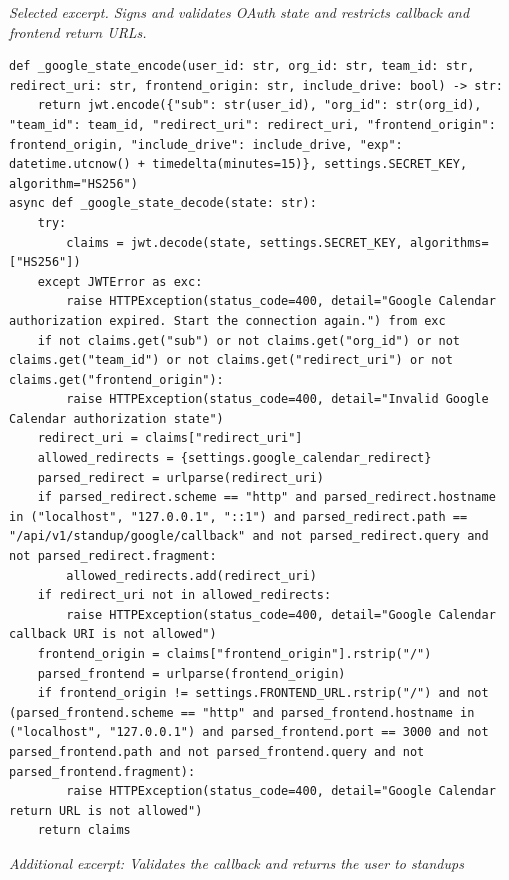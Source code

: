 \documentclass[11pt,a4paper]{article}
\begin{document}
{\textit{Selected excerpt. Signs and validates OAuth state and restricts callback and frontend return URLs.}

\begin{lstlisting}[style=python]
def _google_state_encode(user_id: str, org_id: str, team_id: str, redirect_uri: str, frontend_origin: str, include_drive: bool) -> str:
    return jwt.encode({"sub": str(user_id), "org_id": str(org_id), "team_id": team_id, "redirect_uri": redirect_uri, "frontend_origin": frontend_origin, "include_drive": include_drive, "exp": datetime.utcnow() + timedelta(minutes=15)}, settings.SECRET_KEY, algorithm="HS256")
async def _google_state_decode(state: str):
    try:
        claims = jwt.decode(state, settings.SECRET_KEY, algorithms=["HS256"])
    except JWTError as exc:
        raise HTTPException(status_code=400, detail="Google Calendar authorization expired. Start the connection again.") from exc
    if not claims.get("sub") or not claims.get("org_id") or not claims.get("team_id") or not claims.get("redirect_uri") or not claims.get("frontend_origin"):
        raise HTTPException(status_code=400, detail="Invalid Google Calendar authorization state")
    redirect_uri = claims["redirect_uri"]
    allowed_redirects = {settings.google_calendar_redirect}
    parsed_redirect = urlparse(redirect_uri)
    if parsed_redirect.scheme == "http" and parsed_redirect.hostname in ("localhost", "127.0.0.1", "::1") and parsed_redirect.path == "/api/v1/standup/google/callback" and not parsed_redirect.query and not parsed_redirect.fragment:
        allowed_redirects.add(redirect_uri)
    if redirect_uri not in allowed_redirects:
        raise HTTPException(status_code=400, detail="Google Calendar callback URI is not allowed")
    frontend_origin = claims["frontend_origin"].rstrip("/")
    parsed_frontend = urlparse(frontend_origin)
    if frontend_origin != settings.FRONTEND_URL.rstrip("/") and not (parsed_frontend.scheme == "http" and parsed_frontend.hostname in ("localhost", "127.0.0.1") and parsed_frontend.port == 3000 and not parsed_frontend.path and not parsed_frontend.query and not parsed_frontend.fragment):
        raise HTTPException(status_code=400, detail="Google Calendar return URL is not allowed")
    return claims
\end{lstlisting}

\textit{Additional excerpt: Validates the callback and returns the user to standups}

}
\end{document}
